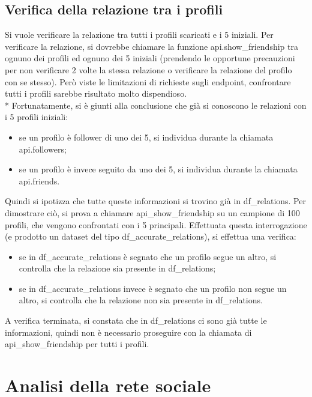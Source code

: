 \documentclass[a4paper, 12pt, twoside]{article}
\begin{document}
\subsection{Verifica della relazione tra i profili}
Si vuole verificare la relazione tra tutti i profili scaricati e i 5 iniziali. Per verificare la relazione, si dovrebbe chiamare la funzione api.show\_friendship tra ognuno dei profili ed ognuno dei 5 iniziali (prendendo le opportune precauzioni per non verificare 2 volte la stessa relazione o verificare la relazione del profilo con se stesso). Però viste le limitazioni di richieste sugli endpoint, confrontare tutti i profili sarebbe risultato molto dispendioso.\\*
Fortunatamente, si è giunti alla conclusione che già si conoscono le relazioni con i 5 profili iniziali:
\begin{itemize}
    \item se un profilo è follower di uno dei 5, si individua durante la chiamata api.followers;
    \item se un profilo è invece seguito da uno dei 5, si individua durante la chiamata api.friends.
\end{itemize}
Quindi si ipotizza che tutte queste informazioni si trovino già in df\_relations. Per dimostrare ciò, si prova a chiamare api\_show\_friendship su un campione di 100 profili, che vengono confrontati con i 5 principali. Effettuata questa interrogazione (e prodotto un dataset del tipo df\_accurate\_relations), si effettua una verifica:
\begin{itemize}
    \item se in df\_accurate\_relations è segnato che un profilo segue un altro, si controlla che la relazione sia presente in df\_relations;
    \item se in df\_accurate\_relations invece è segnato che un profilo non segue un altro, si controlla che la relazione non sia presente in df\_relations.
\end{itemize}
A verifica terminata, si constata che in df\_relations ci sono già tutte le informazioni, quindi non è necessario proseguire con la chiamata di api\_show\_friendship per tutti i profili.


\section{Analisi della rete sociale} \label{sec:analisi_rete}
\end{document}

